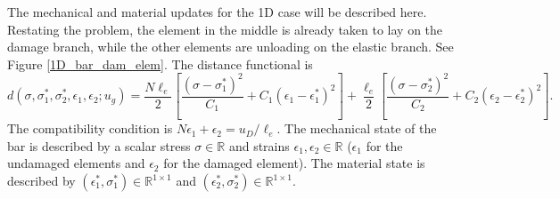 \documentclass[10pt,review]{cas-sc}
\begin{document}
The mechanical and material updates for the 1D case will be described here. Restating the problem, the element in the middle is already taken to lay on the damage branch, while the other elements are unloading on the elastic branch. See Figure \ref{1D_bar_dam_elem}. The distance functional is 
\begin{equation*}
 	d(\sigma,\sigma_1^*,\sigma_2^*,\epsilon_1,\epsilon_2;u_g) = \frac{N \ell_e}{2} \left[ \frac{(\sigma - \sigma_1^*)^2}{C_1} +  C_1(\epsilon_1 - \epsilon_1^*)^2 \right] + \frac{\ell_e}{2}  \left[ \frac{(\sigma - \sigma_2^*)^2}{C_2} +  C_2(\epsilon_2 - \epsilon_2^*)^2 \right].
\end{equation*}
The compatibility condition is $N \epsilon_1 + \epsilon_2 = u_D/\ell_e$. The mechanical state of the bar is described by a scalar stress $\sigma \in \mathbb{R}$ and strains $\epsilon_1, \epsilon_2 \in \mathbb{R}$ ($\epsilon_1$ for the undamaged elements and $\epsilon_2$ for the damaged element). The material state is described by $(\epsilon_1^*, \sigma_1^*) \in \mathbb{R}^{1\times 1}$ and $(\epsilon_2^*, \sigma_2^*) \in \mathbb{R}^{1\times 1}$.
\end{document}
